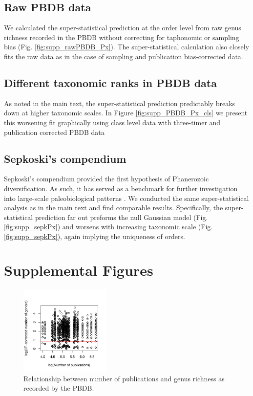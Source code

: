 \documentclass[12pt]{article}
\let\citep=\cite
\begin{document}
\subsection{Raw PBDB data} \label{sec:rawPBDB}
We calculated the super-statistical prediction at the order level from
raw genus richness recorded in the PBDB without correcting for
taphonomic or sampling bias (Fig. \ref{fig:supp_rawPBDB_Px}). The
super-statistical calculation also closely fits the raw data as in the
case of sampling and publication bias-corrected data.

\subsection{Different taxonomic ranks in PBDB data}
As noted in the main text, the super-statistical prediction
predictably breaks down at higher taxonomic scales. In Figure
\ref{fig:supp_PBDB_Px_cls} we present this worsening fit graphically
using class level data with three-timer and publication corrected PBDB
data

\subsection{Sepkoski's compendium} \label{sec:suppSepk}
Sepkoski's compendium \citep{sepkoski1992} provided the first
hypothesis of Phanerozoic diversification.  As such, it has served as
a benchmark for further investigation into large-scale paleobiological
patterns \citep{alroy08}.  We conducted the same super-statistical
analysis as in the main text and find comparable results.
Specifically, the super-statistical prediction far out preforms the
null Gaussian model (Fig. \ref{fig:supp_sepkPx}) and worsens with
increasing taxonomic scale (Fig. \ref{fig:supp_sepkPx}), again
implying the uniqueness of orders.

\section*{Supplemental Figures}

\begin{figure}[!hp]
  \centering
  \includegraphics[width=0.4\textwidth]{../../figSupp_divByPub.pdf}
  \caption[Relationship between number of publications and genus
  richness]{Relationship between number of publications and genus
    richness as recorded by the PBDB.}
  \label{fig:divByPub}
\end{figure}
\end{document}
